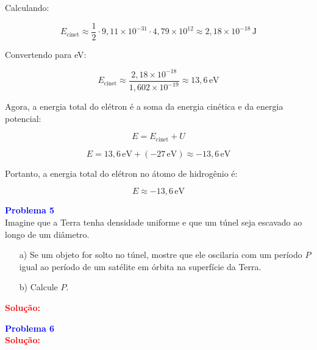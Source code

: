 \documentclass[a4paper,12pt]{article}
\begin{document}
\begin{flushleft}
Calculando:

\begin{equation}
E_{\text{cinet}} \approx \frac{1}{2} \cdot 9,11 \times 10^{-31} \cdot 4,79 \times 10^{12} \approx 2,18 \times 10^{-18} \, \text{J}
\end{equation}

Convertendo para eV:

\begin{equation}
E_{\text{cinet}} \approx \frac{2,18 \times 10^{-18}}{1,602 \times 10^{-19}} \approx 13,6 \, \text{eV}
\end{equation}

Agora, a energia total do elétron é a soma da energia cinética e da energia potencial:

\begin{equation}
E = E_{\text{cinet}} + U
\end{equation}

\begin{equation}
E = 13,6 \, \text{eV} + (-27 \, \text{eV}) \approx -13,6 \, \text{eV}
\end{equation}

Portanto, a energia total do elétron no átomo de hidrogênio é:

\begin{equation}
\boxed{E \approx -13,6 \, \text{eV}}
\end{equation}
\end{flushleft}

\begin{flushleft}
\textbf{\textcolor{blue}{\Large Problema 5}}\\

Imagine que a Terra tenha densidade uniforme e que um túnel seja escavado ao longo de um diâmetro.

\begin{enumerate}
    \item[a)] Se um objeto for solto no túnel, mostre que ele oscilaria com um período \( P \) igual ao 
    período de um satélite em órbita na superfície da Terra.
    \item[b)] Calcule \( P \).
\end{enumerate}

\textcolor{red}{\textbf{Solução:}}\\
\end{flushleft}

\begin{flushleft}
\textbf{\textcolor{blue}{\Large Problema 6}}\\

\textcolor{red}{\textbf{Solução:}}\\
\end{flushleft}
\end{document}
